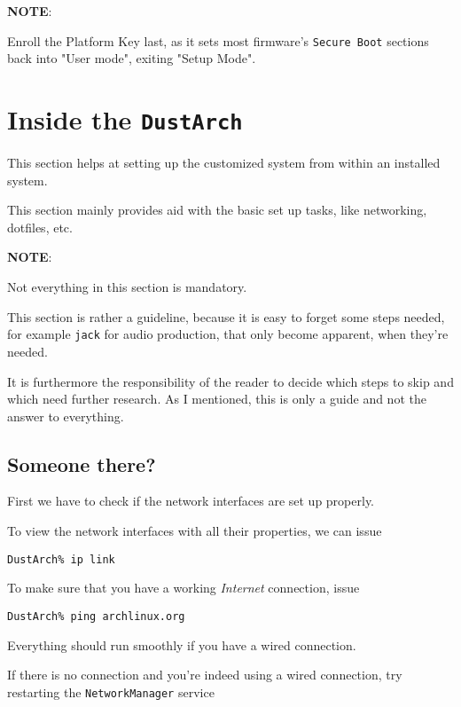 \documentclass[9pt]{report}
\newcommand{\admonition}[2]{\textbf{#1}: {#2}}
\begin{document}
\admonition{NOTE}{Enroll the Platform Key last, as it sets most firmware’s \texttt{Secure Boot} sections back into "User mode", exiting "Setup Mode".

}

\vfill\eject

\hypertarget{x-inside-the-dustarch}{\chapter{Inside the \texttt{DustArch}}}
This section helps at setting up the customized system from within an installed system.


This section mainly provides aid with the basic set up tasks, like networking, dotfiles, etc.


\admonition{NOTE}{Not everything in this section is mandatory.


This section is rather a guideline, because it is easy to forget some steps needed, for example \texttt{jack} for audio production, that only become apparent, when they’re needed.


It is furthermore the responsibility of the reader to decide which steps to skip and which need further research.
As I mentioned, this is only a guide and not the answer to everything.

}

\vfill\eject

\hypertarget{x-someone-there}{\section{Someone there?}}
First we have to check if the network interfaces are set up properly.


To view the network interfaces with all their properties, we can issue


\begin{verbatim}
DustArch% ip link
\end{verbatim}

To make sure that you have a working \emph{Internet} connection, issue


\begin{verbatim}
DustArch% ping archlinux.org
\end{verbatim}

Everything should run smoothly if you have a wired connection.


If there is no connection and you’re indeed using a wired connection, try restarting the \texttt{NetworkManager} service
\end{document}
